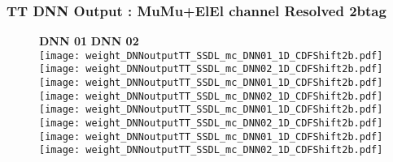 \documentclass[9pt]{beamer}
\begin{document}
\begin{frame}
	\frametitle{TT DNN Output : MuMu+ElEl channel Resolved 2btag}
	\begin{figure}
	    \textbf{DNN 01} \hspace{1.2cm} \textbf{DNN 02} \\
        \centering
		\texttt{[image: weight\_DNNoutputTT\_SSDL\_mc\_DNN01\_1D\_CDFShift2b.pdf]}
		\texttt{[image: weight\_DNNoutputTT\_SSDL\_mc\_DNN02\_1D\_CDFShift2b.pdf]}
        \\
		\texttt{[image: weight\_DNNoutputTT\_SSDL\_mc\_DNN01\_1D\_CDFShift2b.pdf]}
		\texttt{[image: weight\_DNNoutputTT\_SSDL\_mc\_DNN02\_1D\_CDFShift2b.pdf]}
        \\
		\texttt{[image: weight\_DNNoutputTT\_SSDL\_mc\_DNN01\_1D\_CDFShift2b.pdf]}
		\texttt{[image: weight\_DNNoutputTT\_SSDL\_mc\_DNN02\_1D\_CDFShift2b.pdf]}
        \\
		\texttt{[image: weight\_DNNoutputTT\_SSDL\_mc\_DNN01\_1D\_CDFShift2b.pdf]}
		\texttt{[image: weight\_DNNoutputTT\_SSDL\_mc\_DNN02\_1D\_CDFShift2b.pdf]}
        \\
	\end{figure}
\end{frame}
\end{document}

